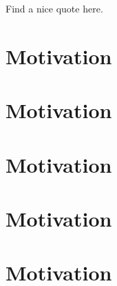 \begin{quoting}
Find a nice quote here.
\end{quoting}


\section{Motivation}
\section{Motivation}
\section{Motivation}
\section{Motivation}
\section{Motivation}
